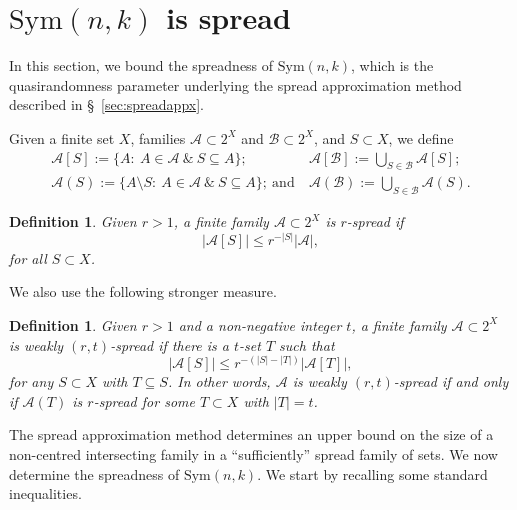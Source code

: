 \documentclass{amsart}
\newtheorem{defi}[thm]{Definition}
\newcommand{\mcal}{\mathcal}
\newcommand{\sym}{\mathrm{Sym}}
\begin{document}
\section{\texorpdfstring{$\sym(n,k)$ is spread}{Sym(n,k) is spread}}\label{sec:spread}
In this section, we bound the spreadness of $\sym(n,k)$, which is the quasirandomness parameter underlying the spread approximation method described in \S~\ref{sec:spreadappx}. 

Given a finite set $X$, families $\mcal{A}\subset 2^{X}$ and $\mcal{B}\subset 2^{X}$, and $S\subset X$, we define
\begin{align*}
\mcal{A}[S]:=\{A \colon\ A \in \mcal{A}\ \&\ S\subseteq A\};\
& \mcal{A}[\mcal{B}]:=\bigcup\limits_{S \in \mcal{B}} \mcal{A}[S]; \\
\mcal{A}(S):=\{A\setminus S \colon\ A \in \mcal{A}\ \&\ S\subseteq A\};\ \text{and}\ &
\mcal{A}(\mcal{B}):=\bigcup\limits_{S \in \mcal{B}} \mcal{A}(S).
\end{align*} 

\begin{defi}\label{def:spread}
Given $r>1$, a finite family $\mcal{A} \subset 2^{X}$ is $r$-spread if 
\[|\mcal{A}[S]| \leq r^{-|S|}|\mcal{A}|,\] for all $S\subset X$.
\end{defi}
We also use the following stronger measure.
\begin{defi}\label{def:rtspread}
Given $r>1$ and a non-negative integer $t$, a finite family $\mcal{A} \subset 2^{X}$ is weakly $(r,t)$-spread if there is a $t$-set $T$ such that 
\[|\mcal{A}[S]| \leq r^{-(|S|-|T|)}|\mcal{A}[T]|,\] for any $S\subset X$ with $T\subseteq S$. In other words, $\mcal{A}$ is weakly $(r,t)$-spread if and only if $\mcal{A}(T)$ is $r$-spread for some $T\subset X$ with $|T|=t$.
\end{defi}

The spread approximation method determines an upper bound on the size of a non-centred intersecting family in a ``sufficiently'' spread family of sets. We now determine the spreadness of $\sym(n,k)$. We start by recalling some standard inequalities. 
\end{document}
